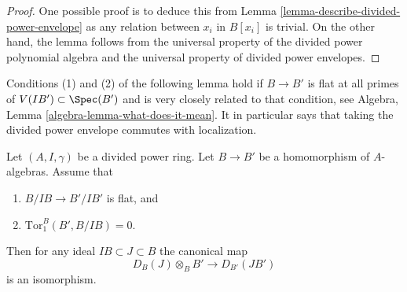 \begin{proof}
One possible proof is to deduce this from
Lemma \ref{lemma-describe-divided-power-envelope}
as any relation between $x_i$ in $B[x_i]$ is trivial.
On the other hand, the lemma follows from the universal property
of the divided power polynomial algebra and the universal property of
divided power envelopes.
\end{proof}

\noindent
Conditions (1) and (2) of the following lemma hold if $B \to B'$ is flat
at all primes of $V(IB') \subset \Spec(B')$ and is very closely related
to that condition, see
Algebra, Lemma \ref{algebra-lemma-what-does-it-mean}.
It in particular says that taking the divided power
envelope commutes with localization.

\begin{lemma}
\label{lemma-flat-base-change-divided-power-envelope}
Let $(A, I, \gamma)$ be a divided power ring.
Let $B \to B'$ be a homomorphism of $A$-algebras.
Assume that
\begin{enumerate}
\item $B/IB \to B'/IB'$ is flat, and
\item $\text{Tor}_1^B(B', B/IB) = 0$.
\end{enumerate}
Then for any ideal $IB \subset J \subset B$ the canonical map
$$
D_B(J) \otimes_B B' \longrightarrow D_{B'}(JB')
$$
is an isomorphism.
\end{lemma}

